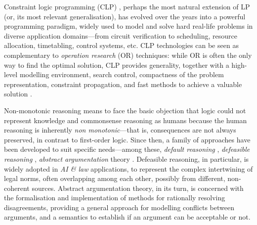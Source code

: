 \documentclass[12pt,a4paper,openright,twoside]{book}
\begin{document}
Constraint logic programming (CLP) \cite{jaffar1987}, perhaps the most natural extension of LP (or, its most relevant generalisation), has evolved over the years into a powerful programming paradigm, widely used to model and solve hard real-life problems \cite{Rossi2000} in diverse application domains---from circuit verification to scheduling, resource allocation, timetabling, control systems, etc.
%
CLP technologies can be seen as complementary to \emph{operation research} (OR) techniques: while OR is often the only way to find the optimal solution, CLP provides generality, together with a high-level modelling environment, search control, compactness of the problem representation, constraint propagation, and fast methods to achieve a valuable solution \cite{rossi2008}.
%

Non-monotonic reasoning means to face the basic objection \cite{minsky1975} that logic could not represent knowledge and commonsense reasoning as humans because the human reasoning is inherently \emph{non monotonic}---that is, consequences are not always preserved, in contrast to first-order logic.
%
Since then, a family of approaches have been developed to suit specific needs---among these, \emph{default reasoning} \cite{reiter1980}, \emph{defeasible reasoning} \cite{pollock1987}, \emph{abstract argumentation} theory \cite{bondarenko1997}. 
%
Defeasible reasoning, in particular, is widely adopted in \emph{AI \& law} applications, to represent the complex intertwining of legal norms, often overlapping among each other, possibly from different, non-coherent sources.
%
Abstract argumentation theory, in its turn, is concerned with the formalisation and implementation of methods for rationally resolving disagreements, providing a general approach for modelling conflicts between arguments, and a semantics to establish if an argument can be acceptable or not.
\end{document}
